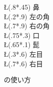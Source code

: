 \begin{InText}
\begin{figure}[htbp]
\begin{center}
 \GridLineWidth{.2pt}
 \SetLabels 
  \T\L(.8*.45) 鼻\\
  \T\L(.2*.9) 左の角\\
  \T\L(.7*.9) 右の角\\ 
  \T\L(.75*.3)  口\\ 
  \T\L(.65*.1) 髭\\ 
  \T\L(.3*.6) 左目\\ 
  \T\L(.7*.6)  右目\\ 
 \endSetLabels
 \ifdraft
   \ShowGrid
 \fi
 \strut{}%
 \caption{ の使い方\label{fig:you}}%
\end{center} 
\end{figure} 
\end{InText}

